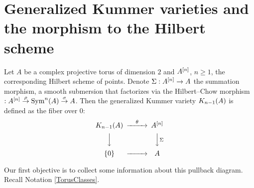 \section{Generalized Kummer varieties and the morphism to the Hilbert scheme}

\begin{definition}
Let $A$ be a complex projective torus of dimension $2$ and $A\hilb{n}$, $n\geq 1$, the corresponding Hilbert scheme of points. Denote $\Sigma : A\hilb{n} \rightarrow A$ the summation morphism, a smooth submersion that factorizes via the Hilbert--Chow morphism $: A\hilb{n}\stackrel{\rho}{\rightarrow}\Sym^n(A)\stackrel{\sigma}{\rightarrow} A$. Then the generalized Kummer variety $\kum{A}{n-1}$ is defined as the fiber over $0$:
\begin{equation}\label{square}
\begin{CD}
\kum{A}{n-1} @>\theta >> A\hilb{n}\\
@VVV @VV\Sigma V\\
\{0\} @> >> A
\end{CD}
\end{equation}
\end{definition}
Our first objective is to collect some information about this pullback diagram. 
Recall Notation \ref{TorusClasses}.


